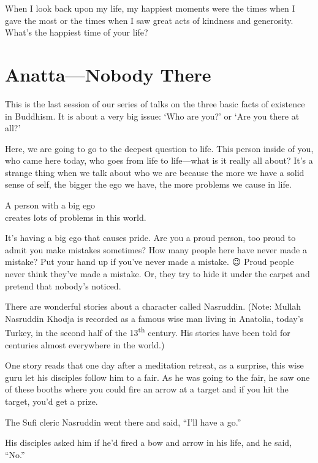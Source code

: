 \documentclass[12pt, openany]{book}
\newenvironment{aphorism}%
{%
\begin{center}\begin{itshape}
}%
{\end{itshape}\end{center}
}%
\newcommand{\fleuron}{%
\begin{center}
\vspace{2em}
\fallbackfont{❦}
\end{center}
}
\begin{document}
When I look back upon my life, my happiest moments were the times when I gave the most or the times when I saw great acts of kindness and generosity. What’s the happiest time of your life? 

\fleuron

\chapter{Anatta—Nobody There} 

This is the last session of our series of talks on the three basic facts of existence in Buddhism. It is about a very big issue: ‘Who are you?’ or ‘Are you there at all?’ 

Here, we are going to go to the deepest question to life. This person inside of you, who came here today, who goes from life to life—what is it really all about? It’s a strange thing when we talk about who we are because the more we have a solid sense of self, the bigger the ego we have, the more problems we cause in life. 

\begin{aphorism}
A person with a big ego\\  
creates lots of problems in this world.
\end{aphorism}

It’s having a big ego that causes pride. Are you a proud person, too proud to admit you make mistakes sometimes? How many people here have never made a mistake? Put your hand up if you’ve never made a mistake. 😉 Proud people never think they’ve made a mistake. Or, they try to hide it under the carpet and pretend that nobody’s noticed. 

There are wonderful stories about a character called Nasruddin. (Note: Mullah Nasruddin Khodja is recorded as a famous wise man living in Anatolia, today’s Turkey, in the second half of the 13\textsuperscript{th} century. His stories have been told for centuries almost everywhere in the world.) 

One story reads that one day after a meditation retreat, as a surprise, this wise guru let his disciples follow him to a fair. As he was going to the fair, he saw one of these booths where you could fire an arrow at a target and if you hit the target, you’d get a prize. 

The Sufi cleric Nasruddin went there and said, “I’ll have a go.” 

His disciples asked him if he’d fired a bow and arrow in his life, and he said, “No.” 
\end{document}
